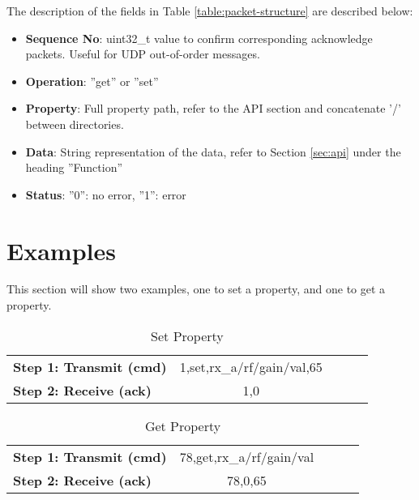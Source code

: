 \documentclass[11pt]{article}
\begin{document}
The description of the fields in Table \ref{table:packet-structure} are described below:
\begin{itemize}
	\item[]{\bf Sequence No}: uint32\_t value to confirm corresponding acknowledge packets. Useful for UDP out-of-order messages.
	\item[]{\bf Operation}: ''get'' or ''set''
	\item[]{\bf Property}: Full property path, refer to the API section and concatenate '/' between directories.
	\item[]{\bf Data}: String representation of the data, refer to Section \ref{sec:api} under the heading ''Function''
	\item[]{\bf Status}: ''0'': no error, ''1'': error
\end{itemize}

\section{Examples}
\label{sec:examples}
This section will show two examples, one to set a property, and one to get a property.
\begin{table}[H]
\centering
\caption{Set Property}
\label{table:set-property}
\begin{tabular}{l|l|l|l|l|}
\cline{2-2}
{\bf Step 1: Transmit (cmd)} & \multicolumn{1}{c|}{1,set,rx\_a/rf/gain/val,65} \\ \cline{2-2}
{\bf Step 2: Receive (ack)}  & \multicolumn{1}{c|}{1,0}                        \\ \cline{2-2}
\end{tabular}
\end{table}

\begin{table}[H]
\centering
\caption{Get Property}
\label{table:get-property}
\begin{tabular}{l|l|l|l|l|}
\cline{2-2}
{\bf Step 1: Transmit (cmd)} & \multicolumn{1}{c|}{78,get,rx\_a/rf/gain/val} \\ \cline{2-2}
{\bf Step 2: Receive (ack)}  & \multicolumn{1}{c|}{78,0,65}                  \\ \cline{2-2} 
\end{tabular}
\end{table}
\end{document}

